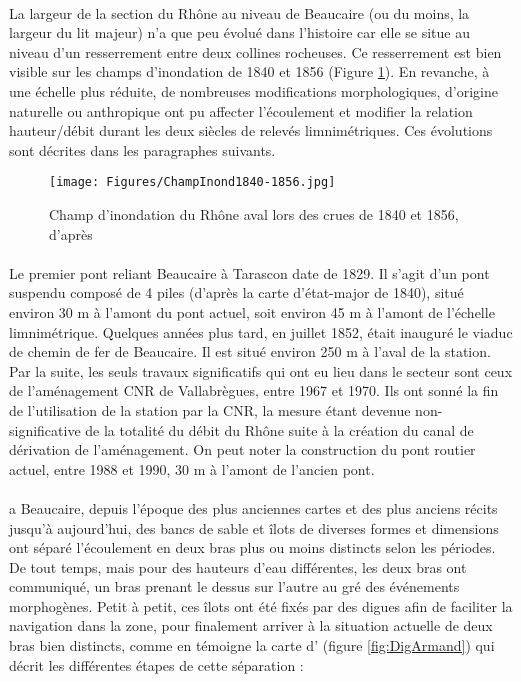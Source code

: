 \documentclass[11pt]{article}
\begin{document}
    \paragraph{} La largeur de la section du Rhône au niveau de Beaucaire (ou du moins, la largeur du lit majeur) n'a que peu évolué dans l'histoire car elle se situe au niveau d'un resserrement entre deux collines rocheuses. Ce resserrement est bien visible sur les champs d'inondation de 1840 et 1856 (Figure \ref{Champ1856}). En revanche, à une échelle plus réduite, de nombreuses modifications morphologiques, d'origine naturelle ou anthropique ont pu affecter l'écoulement et modifier la relation hauteur/débit durant les deux siècles de relevés limnimétriques. Ces évolutions sont décrites dans les paragraphes suivants.
    
    \begin{figure}[h]
        \centering
        \texttt{[image: Figures/ChampInond1840-1856.jpg]}
        \caption{Champ d'inondation du Rhône aval lors des crues de 1840 et 1856, d'après \citet{parde_regime_1925}}
        \label{Champ1856}
    \end{figure}
    

	\paragraph{} Le premier pont reliant Beaucaire à Tarascon date de 1829. Il s'agit d'un pont suspendu composé de 4 piles (d'après la carte d'état-major de 1840), situé environ 30 m à l'amont du pont actuel, soit environ 45 m à l'amont de l'échelle limnimétrique. Quelques années plus tard, en juillet 1852, était inauguré le viaduc de chemin de fer de Beaucaire. Il est situé environ 250 m à l'aval de la station. Par la suite, les seuls travaux significatifs qui ont eu lieu dans le secteur sont ceux de l'aménagement CNR de Vallabrègues, entre 1967 et 1970. Ils ont sonné la fin de l'utilisation de la station par la CNR, la mesure étant devenue non-significative de la totalité du débit du Rhône suite à la création du canal de dérivation de l'aménagement. On peut noter la construction du pont routier actuel, entre 1988 et 1990, 30 m à l'amont de l'ancien pont. 
        

        \paragraph{} a Beaucaire, depuis l'époque des plus anciennes cartes et des plus anciens récits jusqu'à aujourd'hui, des bancs de sable et îlots de diverses formes et dimensions ont séparé l'écoulement en deux bras plus ou moins distincts selon les périodes. De tout temps, mais pour des hauteurs d'eau différentes, les deux bras ont communiqué, un bras prenant le dessus sur l'autre au gré des événements morphogènes. Petit à petit, ces îlots ont été fixés par des digues afin de faciliter la navigation dans la zone, pour finalement arriver à la situation actuelle de deux bras bien distincts, comme en témoigne la carte d'\citet{armand_ii_1907} (figure \ref{fig:DigArmand}) qui décrit les différentes étapes de cette séparation :
        
\end{document}
